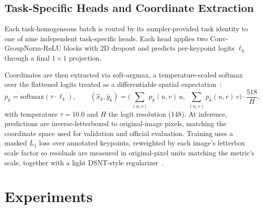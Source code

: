 \documentclass[runningheads]{llncs}
\begin{document}
\subsection{Task-Specific Heads and Coordinate Extraction}
Each task-homogeneous batch is routed by its sampler-provided task identity to one of nine independent task-specific heads. Each head applies two Conv-GroupNorm-ReLU blocks with 2D dropout and predicts per-keypoint logits $\ell_k$ through a final $1\times1$ projection.

Coordinates are then extracted via soft-argmax, a temperature-scaled softmax over the flattened logits treated as a differentiable spatial expectation~\cite{nibali2018numerical}:
\begin{equation}
p_k = \text{softmax}(\tau \cdot \ell_k), \qquad
(\hat{x}_k, \hat{y}_k) = \Big(\sum_{(u,v)} p_k(u,v)\, u,\ \sum_{(u,v)} p_k(u,v)\, v\Big) \cdot \frac{518}{H},
\label{eq:softargmax}
\end{equation}
with temperature $\tau=10.0$ and $H$ the logit resolution ($148$). At inference, predictions are inverse-letterboxed to original-image pixels, matching the coordinate space used for validation and official evaluation. Training uses a masked $L_1$ loss over annotated keypoints, reweighted by each image's letterbox scale factor so residuals are measured in original-pixel units matching the metric's scale, together with a light DSNT-style regularizer~\cite{nibali2018numerical}.


\section{Experiments}
\end{document}
